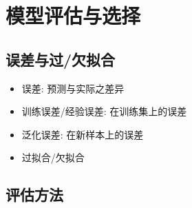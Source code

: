 \documentclass[UTF8]{article}
\begin{document}
\newpage
\section{模型评估与选择}
\subsection{误差与过/欠拟合}
\begin{itemize}
\item 误差: 预测与实际之差异
\item 训练误差/经验误差: 在训练集上的误差
\item 泛化误差: 在新样本上的误差
\item 过拟合/欠拟合
\end{itemize}
\subsection{评估方法}
\end{document}
